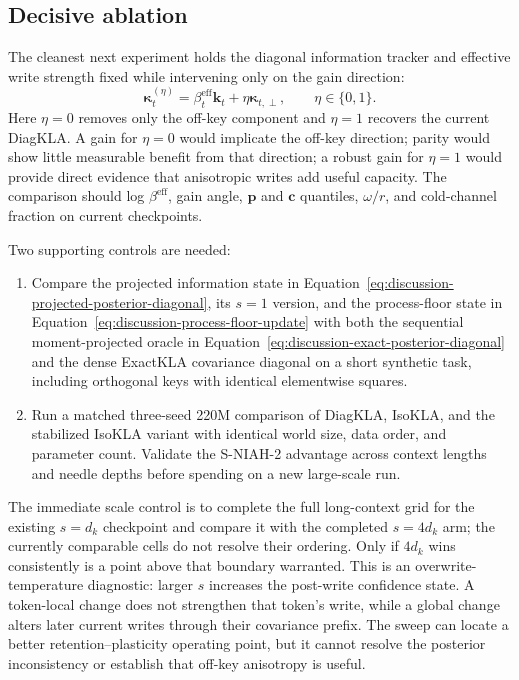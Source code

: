 \documentclass[11pt]{article}
\newcommand{\vct}[1]{\boldsymbol{#1}}
\begin{document}
\subsection{Decisive ablation}

The cleanest next experiment holds the diagonal information tracker and effective write strength
fixed while intervening only on the gain direction:
\begin{equation}
  \vct{\kappa}_t^{(\eta)}
  = \beta_t^{\mathrm{eff}}\vct{k}_t
  +\eta\vct{\kappa}_{t,\perp},
  \qquad \eta\in\{0,1\}.
  \label{eq:discussion-gain-direction-ablation}
\end{equation}
Here $\eta=0$ removes only the off-key component and $\eta=1$ recovers the current DiagKLA. A
gain for $\eta=0$ would implicate the off-key direction; parity would show little measurable
benefit from that direction; a robust gain for $\eta=1$ would provide direct evidence that
anisotropic writes add useful capacity. The comparison should log $\beta^{\mathrm{eff}}$, gain
angle, $\vct{p}$ and $\vct{c}$ quantiles, $\omega/r$, and cold-channel fraction on current
checkpoints.

Two supporting controls are needed:
\begin{enumerate}
  \item Compare the projected information state in
    Equation~\eqref{eq:discussion-projected-posterior-diagonal}, its $s=1$ version, and the
    process-floor state in Equation~\eqref{eq:discussion-process-floor-update} with both the
    sequential moment-projected oracle in
    Equation~\eqref{eq:discussion-exact-posterior-diagonal} and the dense ExactKLA covariance
    diagonal on a short synthetic task, including orthogonal keys with identical elementwise
    squares.
  \item Run a matched three-seed 220M comparison of DiagKLA, IsoKLA, and the stabilized IsoKLA
    variant with identical world size, data order, and parameter count. Validate the S-NIAH-2
    advantage across context lengths and needle depths before spending on a new large-scale run.
\end{enumerate}

The immediate scale control is to complete the full long-context grid for the existing $s=d_k$
checkpoint and compare it with the completed $s=4d_k$ arm; the currently comparable cells do not
resolve their ordering. Only if $4d_k$ wins consistently is a point above that boundary warranted.
This is an overwrite-temperature diagnostic: larger $s$ increases the post-write confidence
state. A token-local change does not strengthen that token's write, while a global change alters
later current writes through their covariance prefix. The sweep can locate a better
retention--plasticity operating point, but it cannot resolve the posterior inconsistency or
establish that off-key anisotropy is useful.
\end{document}
